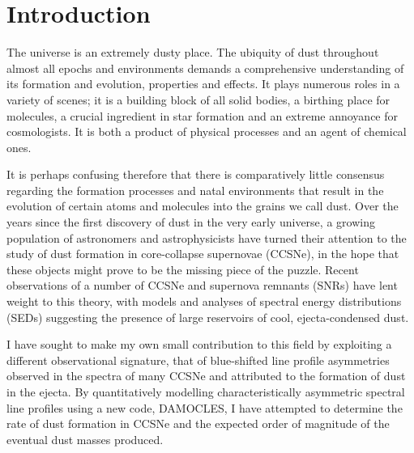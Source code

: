 \chapter{Introduction}\label{chp:chp1}

%
%



The universe is an extremely dusty place.  The ubiquity of dust throughout almost all epochs and environments demands a comprehensive understanding of its formation and evolution, properties and effects.  It plays numerous roles in a variety of scenes; it is a building block of  all solid bodies, a birthing place for molecules, a crucial ingredient in star formation and an extreme annoyance for cosmologists.  It is both a product of physical processes and an agent of chemical ones.

It is perhaps confusing therefore that there is comparatively little consensus regarding the formation processes and natal environments that result in the evolution of certain atoms and molecules into the grains we call dust.  Over the years since the first discovery  of dust in the very early universe, a growing population of astronomers and astrophysicists have turned their attention to the study of dust formation in core-collapse supernovae (CCSNe), in the hope that these objects might prove to be the missing piece of the puzzle.  Recent observations of a number of CCSNe and supernova remnants (SNRs) have lent weight to this theory, with models and analyses of spectral energy distributions (SEDs)  suggesting the presence of large reservoirs of cool, ejecta-condensed dust. 

I have sought to make my own small contribution to this field by exploiting a different observational signature, that of  blue-shifted line profile asymmetries observed in the spectra of many CCSNe and attributed to the formation of dust in the ejecta.  By quantitatively modelling characteristically asymmetric spectral line profiles using a new code, DAMOCLES, I have attempted to determine the rate of dust formation in CCSNe and the expected order of magnitude of the eventual dust masses produced.

